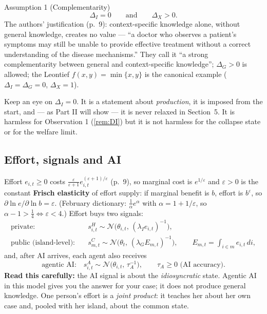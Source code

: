 \documentclass[11pt,a4paper]{article}
\theoremstyle{definition}
\theoremstyle{remark}
\newcommand{\N}{\mathcal{N}}
\newcommand{\tA}{\tau_A}
\newcommand{\lI}{\lambda_I}
\newcommand{\lG}{\lambda_G}
\begin{document}
\begin{paperbox}{Assumption 1 (Complementarity)}
\[\Delta_I=0\qquad\text{and}\qquad \Delta_X>0.\]
The authors' justification (p.~9): context-specific knowledge alone, without general
knowledge, creates no value --- ``a doctor who observes a patient's symptoms may still be unable to provide
effective treatment without a correct understanding of the disease mechanisms.'' They call it ``a strong
complementarity between general and context-specific knowledge''; $\Delta_G>0$ is allowed; the Leontief $f(x,y)=\min\{x,y\}$ is the
canonical example ($\Delta_I=\Delta_G=0$, $\Delta_X=1$).
\end{paperbox}

\noindent Keep an eye on $\Delta_I=0$. It is a statement about \emph{production}, it is imposed from the
start, and --- as Part II will show --- it is never relaxed in Section~5. It is harmless for Observation 1
(\cref{rem:DI}) but it is not harmless for the collapse state or for the welfare limit.

\subsection{Effort, signals and AI}
Effort $e_{i,t}\ge0$ costs $\frac{\varepsilon}{\varepsilon+1}e_{i,t}^{(\varepsilon+1)/\varepsilon}$ (p.~9), so
marginal cost is $e^{1/\varepsilon}$ and $\varepsilon>0$ is the constant \textbf{Frisch elasticity} of effort
supply: if marginal benefit is $b$, effort is $b^{\varepsilon}$, so $\partial\ln e/\partial\ln b=\varepsilon$.
(February dictionary: $\frac1\alpha e^\alpha$ with $\alpha=1+1/\varepsilon$, so $\alpha-1>\frac14\iff\varepsilon<4$.)
Effort buys two signals:
\begin{align}
\text{private:}\quad & s^H_{i,t}\sim\N\bigl(\theta_{i,t},\,(\lI e_{i,t})^{-1}\bigr),\\
\text{public (island-level):}\quad & s^C_{m,t}\sim\N\bigl(\theta_t,\,(\lG E_{m,t})^{-1}\bigr),\qquad
E_{m,t}=\textstyle\int_{i\in m}e_{i,t}\,di,
\end{align}
and, after AI arrives, each agent also receives
\begin{equation}
\text{agentic AI:}\quad s^A_{i,t}\sim\N\bigl(\theta_{i,t},\,\tA^{-1}\bigr),\qquad \tA\ge0
\text{ (AI accuracy).}
\end{equation}
\textbf{Read this carefully:} the AI signal is about the \emph{idiosyncratic} state. Agentic AI in this model
gives you the answer for your case; it does not produce general knowledge. One person's effort is a
\emph{joint product}: it teaches her about her own case and, pooled with her island, about the common state.
\end{document}
